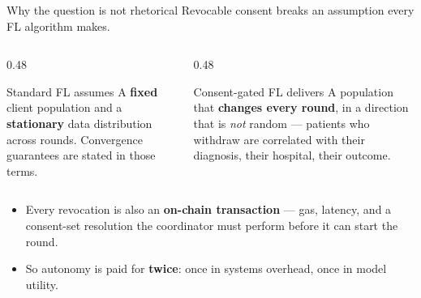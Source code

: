\documentclass[aspectratio=169, 11pt]{beamer}
\begin{document}
\begin{frame}{Why the question is not rhetorical}
Revocable consent breaks an assumption every FL algorithm makes.
\vspace{0.6em}
\begin{columns}[T]
\begin{column}{0.48\textwidth}
\begin{block}{Standard FL assumes}
A \textbf{fixed} client population and a \textbf{stationary} data
distribution across rounds. Convergence guarantees are stated in those terms.
\end{block}
\end{column}
\begin{column}{0.48\textwidth}
\begin{alertblock}{Consent-gated FL delivers}
A population that \textbf{changes every round}, in a direction that is
\emph{not} random --- patients who withdraw are correlated with their
diagnosis, their hospital, their outcome.
\end{alertblock}
\end{column}
\end{columns}
\vspace{0.7em}
\begin{itemize}
\item Every revocation is also an \textbf{on-chain transaction} --- gas,
      latency, and a consent-set resolution the coordinator must perform
      before it can start the round.
\item So autonomy is paid for \textbf{twice}: once in systems overhead, once
      in model utility.
\end{itemize}
\end{frame}
\end{document}
